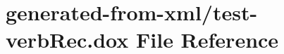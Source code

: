 \hypertarget{test-verbRec_8dox}{}\section{generated-\/from-\/xml/test-\/verb\+Rec.dox File Reference}
\label{test-verbRec_8dox}
